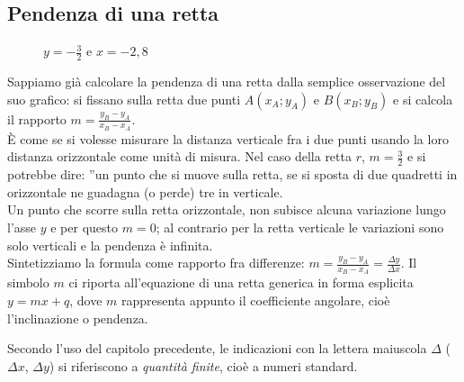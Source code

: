 \subsection{Pendenza di una retta}
\label{subsec:diff01_pendretta}

\begin{figure}[h]
\begin{inaccessibleblock}
 \begin{center}
 \begin{minipage}[]{.31 \textwidth}
  \rettadueterzi
  \caption{$y=\frac{3}{2}x-1$}
 \end{minipage} 
 \begin{minipage}[]{.31 \textwidth}
  \rettamenounquarto
  \caption{$y=-\frac{1}{4}x+\frac{1}{2}$}
 \end{minipage} 
 \begin{minipage}[]{.31 \textwidth}
  \retteorvert
  \caption{$y=-\frac{3}{2}$ e $x=-2,8$}
 \end{minipage}
 \end{center}
\end{inaccessibleblock}
\label{fig:diff01_ret}
\end{figure}


Sappiamo già calcolare la pendenza di una retta dalla semplice osservazione 
del suo grafico: si fissano sulla retta due punti $A(x_A; y_A)$ e $B(x_B; 
y_B)$
e si calcola il rapporto $m=\frac{y_B-y_A}{x_B-x_A}$.\\
È come se si volesse misurare la distanza verticale
fra i due punti usando la loro distanza orizzontale come unità di misura. 
Nel caso della retta $r$, $m=\frac{3}{2}$ e si potrebbe dire: ''un punto 
che 
si 
muove sulla retta, se si sposta di due quadretti in orizzontale
ne guadagna (o perde) tre in verticale.\\
Un punto che scorre sulla retta orizzontale, non subisce
alcuna variazione lungo l'asse $y$ e per questo $m=0$; al contrario per la
retta verticale le variazioni sono solo verticali e la pendenza è
infinita.\\
Sintetizziamo la formula come rapporto fra differenze:
$m=\frac{y_B-y_A}{x_B-x_A}=\frac{\Delta y}{\Delta x}$. Il simbolo $m$ 
ci riporta all'equazione di una retta generica in forma esplicita
$y=mx+q$, dove $m$ rappresenta appunto il coefficiente angolare, cioè 
l'inclinazione o pendenza.
\begin{osservazione}
Secondo l'uso del capitolo precedente, le indicazioni con la lettera
maiuscola $\Delta$ ($\Delta x$, $\Delta y$) si riferiscono a \emph{quantità 
finite},
cioè a numeri standard.
\end{osservazione}

